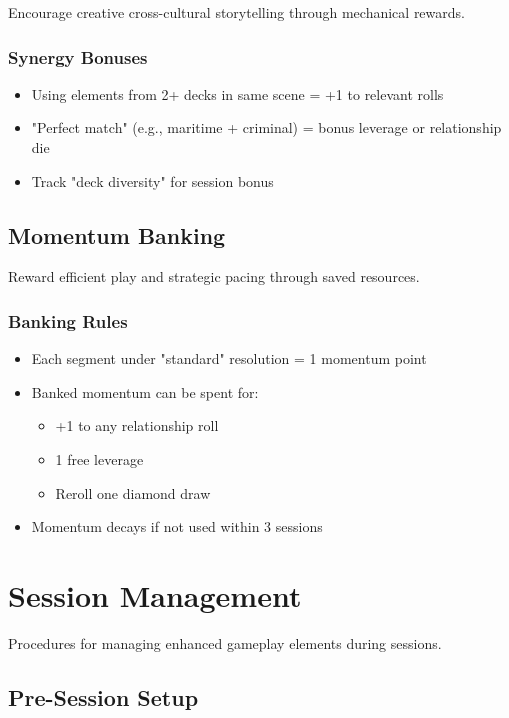 Encourage creative cross-cultural storytelling through mechanical rewards.

\subsubsection{Synergy Bonuses}

\begin{itemize}
\item Using elements from 2+ decks in same scene = +1 to relevant rolls
\item "Perfect match" (e.g., maritime + criminal) = bonus leverage or relationship die
\item Track "deck diversity" for session bonus
\end{itemize}

\subsection{Momentum Banking}

Reward efficient play and strategic pacing through saved resources.

\subsubsection{Banking Rules}

\begin{itemize}
\item Each segment under "standard" resolution = 1 momentum point
\item Banked momentum can be spent for:
  \begin{itemize}
  \item +1 to any relationship roll
  \item 1 free leverage
  \item Reroll one diamond draw
  \end{itemize}
\item Momentum decays if not used within 3 sessions
\end{itemize}

\section{Session Management}

Procedures for managing enhanced gameplay elements during sessions.

\subsection{Pre-Session Setup}

